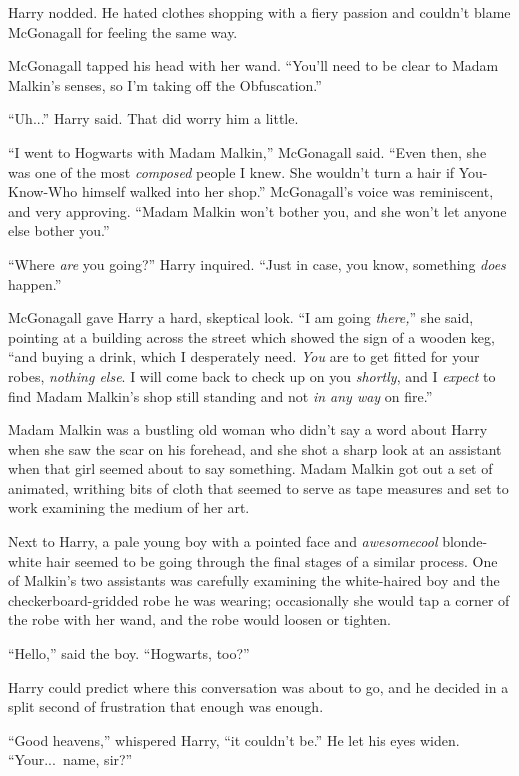 Harry nodded. He hated clothes shopping with a fiery passion and couldn’t blame McGonagall for feeling the same way.

McGonagall tapped his head with her wand. “You’ll need to be clear to Madam Malkin’s senses, so I’m taking off the Obfuscation.”

“Uh...” Harry said. That did worry him a little.

“I went to Hogwarts with Madam Malkin,” McGonagall said. “Even then, she was one of the most \emph{composed} people I knew. She wouldn’t turn a hair if You-Know-Who himself walked into her shop.” McGonagall’s voice was reminiscent, and very approving. “Madam Malkin won’t bother you, and she won’t let anyone else bother you.”

“Where \emph{are} you going?” Harry inquired. “Just in case, you know, something \emph{does} happen.”

McGonagall gave Harry a hard, skeptical look. “I am going \emph{there,}” she said, pointing at a building across the street which showed the sign of a wooden keg, “and buying a drink, which I desperately need. \emph{You} are to get fitted for your robes, \emph{nothing else}. I will come back to check up on you \emph{shortly}, and I \emph{expect} to find Madam Malkin’s shop still standing and not \emph{in any way} on fire.”

Madam Malkin was a bustling old woman who didn’t say a word about Harry when she saw the scar on his forehead, and she shot a sharp look at an assistant when that girl seemed about to say something. Madam Malkin got out a set of animated, writhing bits of cloth that seemed to serve as tape measures and set to work examining the medium of her art.

Next to Harry, a pale young boy with a pointed face and \emph{awesomecool} blonde-white hair seemed to be going through the final stages of a similar process. One of Malkin’s two assistants was carefully examining the white-haired boy and the checkerboard-gridded robe he was wearing; occasionally she would tap a corner of the robe with her wand, and the robe would loosen or tighten.

“Hello,” said the boy. “Hogwarts, too?”

Harry could predict where this conversation was about to go, and he decided in a split second of frustration that enough was enough.

“Good heavens,” whispered Harry, “it couldn’t be.” He let his eyes widen. “Your...\ name, sir?”

